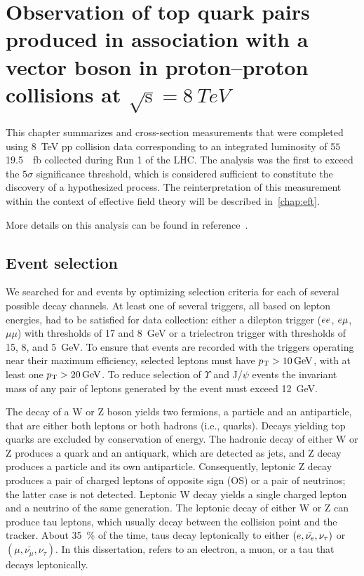 \chapter{Observation of top quark pairs produced in association with a vector boson in proton--proton collisions at $\sqrt{\text{s}} = \SI{8}{TeV}$}
\label{chap:8-TeV}

This chapter summarizes \ttW and \ttZ cross-section measurements that were
completed using \SI{8}{TeV} pp collision data corresponding to an integrated
luminosity of 5$5$\SI{19.5}{\per\femto\barn} collected during Run 1 of the LHC. The \ttZ
analysis was the first to exceed the $5\sigma$ significance threshold, which is
considered sufficient to constitute the discovery of a hypothesized process. The
reinterpretation of this measurement within the context of effective field
theory will be described in~\cref{chap:eft}.

More details on this analysis can be found in reference~\cite{brinkerhoff-thesis}.

\section{Event selection}
\label{section:8-event-selection}
\begin{table}
  
\end{table}
We searched for \ttW and \ttZ events by optimizing selection criteria for each
of several possible decay channels. At least one of several triggers, all based
on lepton energies, had to be satisfied for data collection: either a dilepton
trigger ($ee$, $e\mu$, $\mu\mu$) with \pT thresholds of 17 and \SI{8}{GeV}
or a trielectron trigger with thresholds of 15, 8, and \SI{5}{GeV}. To ensure
that events are recorded with the triggers operating near their maximum
efficiency, selected leptons must have $p_\text{T} > \SI{10}{GeV}$, with at least one
$p_\text{T} > \SI{20}{GeV}$. To reduce selection of $\Upsilon$ and J/$\psi$ events the
invariant mass of any pair of leptons generated by the event must exceed
\SI{12}{GeV}.

The decay of a W or Z boson yields two fermions, a particle and an antiparticle,
that are either both leptons or both hadrons (i.e., quarks). Decays yielding top
quarks are excluded by conservation of energy. The hadronic decay of either W or
Z produces a quark and an antiquark, which are detected as jets, and Z decay
produces a particle and its own antiparticle. Consequently, leptonic Z decay
produces a pair of charged leptons of opposite sign (OS) or a pair of neutrinos;
the latter case is not detected. Leptonic W decay yields a single charged lepton
and a neutrino of the same generation. The leptonic decay of either W or Z can
produce tau leptons, which usually decay between the collision point and the
tracker. About \SI{35}{\percent} of the time, taus decay leptonically to either
$(e, \bar{\nu_e}, \nu_\tau)$ or $(\mu, \bar{\nu_\mu}, \nu_\tau)$. In this
dissertation, \lep refers to an electron, a muon, or a tau that decays leptonically.

